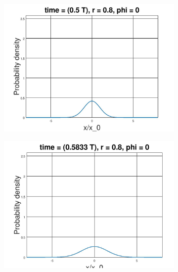 \documentclass[12pt, twoside]{article}
\begin{document}
\begin{figure}[h!]
\begin{subfigure}[h!]{0.3\linewidth}
	\end{subfigure}
	\begin{subfigure}[h!]{0.3\linewidth}
		\includegraphics[width=\linewidth]{graphs/squeezed_vacuum/6.jpg}
	\end{subfigure}
	\begin{subfigure}[h!]{0.3\linewidth}
		\includegraphics[width=\linewidth]{graphs/squeezed_vacuum/7.jpg}
	\end{subfigure}
	\begin{subfigure}[h!]{0.3\linewidth}

\end{subfigure}
\end{figure}
\end{document}
